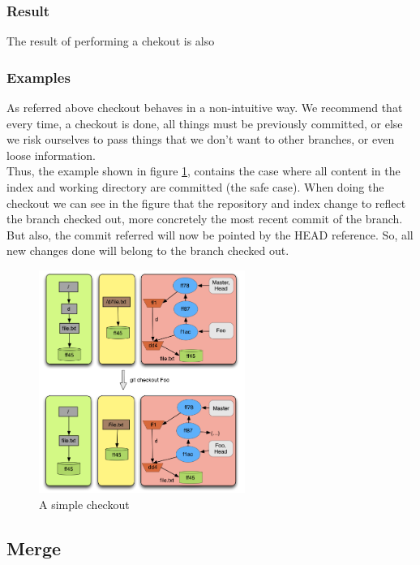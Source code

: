 \subsubsection{Result}
The result of performing a chekout is also 

\subsubsection{Examples}
As referred above checkout behaves in a non-intuitive way. We recommend that
every time, a checkout is done, all things must be previously committed, or else
we risk ourselves to pass things that we don't want to other branches, or even
loose information. \\
Thus, the example shown in figure \ref{fig:checkout}, contains the case where
all content in the index and working directory are committed (the safe case).
When doing the checkout we can see in the figure 
that the repository and index change to reflect the branch checked out, more
concretely the most recent commit of the branch. But
also, the commit referred will now be pointed by the HEAD reference. So, all new
changes done will belong to the branch checked out. \\


\begin{figure}[!t]
   \centering
   \includegraphics[width=0.6\textwidth]{images/checkout.png}
   \caption{A simple checkout}\label{fig:checkout}
\end{figure}

\subsection{Merge}

